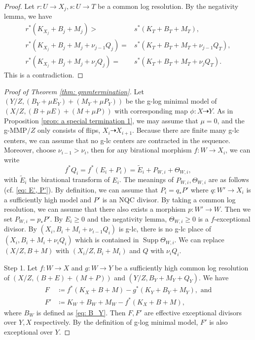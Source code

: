 \documentclass[11pt]{amsart}
\newcommand{\Supp}{\operatorname{Supp}}
\begin{document}
\begin{proof}
Let $r: U \to X_j, s: U \to T$ be a common log resolution. By the negativity lemma, we have
	\begin{align*}
	r^*(K_{X_{j}}+B_{j}+M_{j}) > &s^*(K_T+B_T+M_T),\\
	r^*(K_{X_{j}}+B_{j}+M_{j}+\nu_{j-1} Q_{j}) =& s^*(K_T+B_T+M_T+\nu_{j-1} Q_T),\\
	r^*(K_{X_{j}}+B_{j}+M_{j}+\nu_{j} Q_{j}) =& s^*(K_T+B_T+M_T+\nu_{j} Q_T).
	\end{align*} 
	This is a contradiction.
\end{proof}
\begin{proof}[Proof of Theorem \ref{thm: gmmtermination}]
Let $(Y/Z,(B_Y+\mu E_Y)+(M_Y+\mu P_Y))$ be the g-log minimal model of $(X/Z,(B+\mu E)+(M+\mu P))$ with corresponding map $\phi: X \dashrightarrow Y$. As in Proposition \ref{prop: a special termination 1}, we may assume that $\mu=0$, and the g-MMP$/Z$ only consists of flips, $X_i\dashrightarrow X_{i+1}$. Because there are finite many g-lc centers, we can assume that no g-lc centers are contracted in the sequence. Moreover, choose $\nu_{i-1}>\nu_{i}$, then for any birational morphism $f: W \to X_i$, we can write 
\begin{equation}\label{eq: pullback Q}
f^*Q_i = f^*(E_i+P_i)=\tilde E_i+P_{W,i}+\Theta_{W,i},
\end{equation} with $\tilde E_i$ the birational transform of $E_i$. The meanings of $P_{W,i}, \Theta_{W,i}$ are as follows (cf. \eqref{eq: E', P'}). By definition, we can assume that $P_i=q_*P'$ where $q: W' \to X_i$ is a sufficiently high model and $P'$ is an NQC divisor. By taking a common log resolution, we can assume that there also exists a morphism $p: W' \to W$. Then we set $P_{W,i}=p_*P'$. By $E_i \geq 0$ and the negativity lemma,  $\Theta_{W,i} \geq 0$ is a $f$-exceptional divisor. By $(X_{i}, B_{i}+M_{i}+\nu_{i-1}Q_{i})$ is g-lc, there is no g-lc place of $(X_{i}, B_{i}+M_{i}+\nu_{i}Q_{i})$ which is contained in $\Supp \Theta_{W,i}$. We can replace $(X/Z,B+M)$ with $(X_i/Z,B_i+M_i)$ and $Q$ with $\nu_iQ_i$.

	Step 1. Let $f: W \to X$ and $g: W \to Y$ be a sufficiently high common log resolution of $(X/Z,(B+E)+(M+P))$ and $(Y/Z,B_Y+M_Y+Q_Y)$. We have
	\begin{equation}\label{eq: common resolution}
	\begin{split}
	F &\coloneqq f^*(K_{X}+B+M) -g^*(K_Y+B_Y+M_Y), \text{~and}\\
	F' &\coloneqq K_W+B_W+M_W - f^*(K_{X}+B+M), 
	\end{split}
	\end{equation}
	where $B_W$ is defined as \eqref{eq: B_Y}. Then $F, F'$ are effective exceptional divisors over $Y, X$ respectively. By the definition of g-log minimal model, $F'$ is also exceptional over $Y$.
	

\end{proof}
\end{document}
